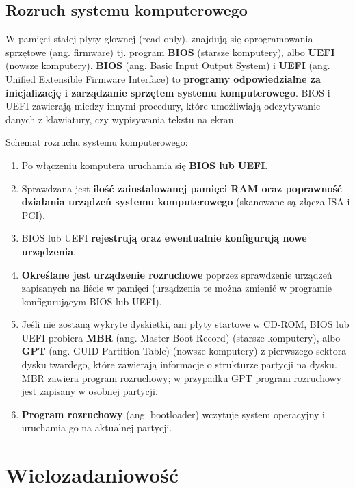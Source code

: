 \documentclass{article}
\begin{document}
\subsection{Rozruch systemu komputerowego}
W pamięci stałej plyty glownej (read only), znajdują się oprogramowania sprzętowe (ang. firmware) tj. program \textbf{BIOS} (starsze komputery), albo \textbf{UEFI} (nowsze komputery). \textbf{BIOS} (ang. Basic Input Output System) i \textbf{UEFI} (ang. Unified Extensible Firmware Interface) to \textbf{programy odpowiedzialne za inicjalizację i zarządzanie sprzętem systemu komputerowego}. BIOS i UEFI zawierają miedzy innymi procedury, które umożliwiają odczytywanie danych z klawiatury, czy wypisywania tekstu na ekran.

Schemat rozruchu systemu komputerowego:
\begin{enumerate}
    \item Po włączeniu komputera uruchamia się \textbf{BIOS lub UEFI}.
    \item Sprawdzana jest \textbf{ilość zainstalowanej pamięci RAM oraz poprawność działania urządzeń systemu komputerowego} (skanowane są złącza ISA i PCI).
    \item BIOS lub UEFI \textbf{rejestrują oraz ewentualnie konfigurują nowe urządzenia}.
    \item \textbf{Określane jest urządzenie rozruchowe} poprzez sprawdzenie urządzeń zapisanych na liście w pamięci (urządzenia te można zmienić w programie konfigurującym BIOS lub UEFI).
    \item Jeśli nie zostaną wykryte dyskietki, ani płyty startowe w CD-ROM, BIOS lub UEFI probiera \textbf{MBR} (ang. Master Boot Record) (starsze komputery), albo \textbf{GPT} (ang. GUID Partition Table) (nowsze komputery) z pierwszego sektora dysku twardego, które zawierają informacje o strukturze partycji na dysku. MBR zawiera program rozruchowy; w przypadku GPT program rozruchowy jest zapisany w osobnej partycji.
    \item \textbf{Program rozruchowy} (ang. bootloader) wczytuje system operacyjny i uruchamia go na aktualnej partycji.
\end{enumerate}

\section{Wielozadaniowość}
\end{document}
